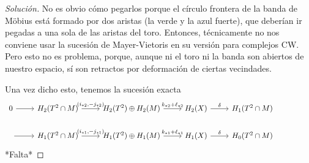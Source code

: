 \documentclass[spanish]{book}
\theoremstyle{definition}
\begin{document}
\begin{proof}[Solución]
	No es obvio cómo pegarlos porque el círculo frontera de la banda de Möbius está formado por dos aristas (la verde y la azul fuerte), que deberían ir pegadas a una sola de las aristas del toro. Entonces, técnicamente no nos conviene usar la sucesión de Mayer-Vietoris en su versión para complejos CW. Pero esto no es problema, porque, aunque ni el toro ni la banda son abiertos de nuestro espacio, sí son retractos por deformación de ciertas vecindades.
	
	Una vez dicho esto, tenemos la sucesión exacta
	\[\begin{tikzcd}
		0 \arrow[r] & H_2(T^2\cap M) \arrow[r,"(i_{*2}\text{,}-j_{*2})"] & H_2(T^2)\oplus H_2(M) \arrow[r,"k_{*2}+\ell_{*2}"] & H_2(X) \arrow[r,"\delta"] & H_1(T^2\cap M)\\
		\arrow[r]&H_1(T^2\cap M) \arrow[r,"(i_{*1}\text{,}-j_{*1})"] &H_1(T^2)\oplus H_1(M) \arrow[r,"k_{*1}+\ell_{*1}"] & H_1(X) \arrow[r,"\delta"] & H_0(T^2\cap M)&&
	\end{tikzcd}\]
	*Falta*
	\end{proof}
	
\end{document}

